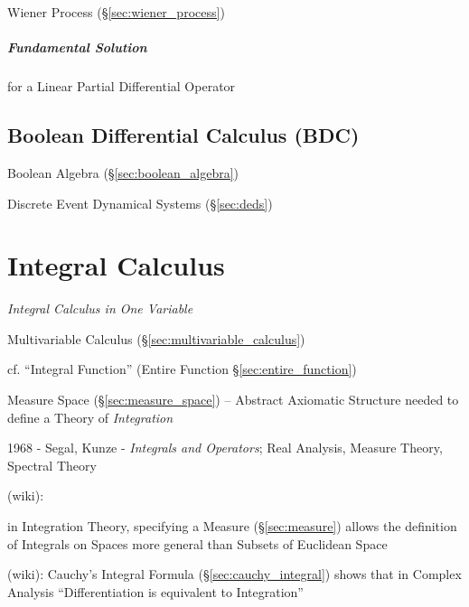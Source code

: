 {\fist Wiener Process (\S\ref{sec:wiener_process})



\subparagraph{Fundamental Solution}\label{sec:fundamental_solution}\hfill

for a Linear Partial Differential Operator



\subsection{Boolean Differential Calculus (BDC)}\label{sec:bdc}

Boolean Algebra (\S\ref{sec:boolean_algebra})

Discrete Event Dynamical Systems (\S\ref{sec:deds})



\section{Integral Calculus}\label{sec:integral_calculus}

\emph{Integral Calculus in One Variable}

\fist Multivariable Calculus (\S\ref{sec:multivariable_calculus})

cf. ``Integral Function'' (Entire Function \S\ref{sec:entire_function})

\fist Measure Space (\S\ref{sec:measure_space}) -- Abstract Axiomatic Structure
needed to define a Theory of \emph{Integration}

1968 - Segal, Kunze - \emph{Integrals and Operators}; Real Analysis, Measure
Theory, Spectral Theory

(wiki):

in Integration Theory, specifying a Measure (\S\ref{sec:measure}) allows the
definition of Integrals on Spaces more general than Subsets of Euclidean Space

(wiki): Cauchy's Integral Formula (\S\ref{sec:cauchy_integral}) shows that in
Complex Analysis ``Differentiation is equivalent to Integration''



}
